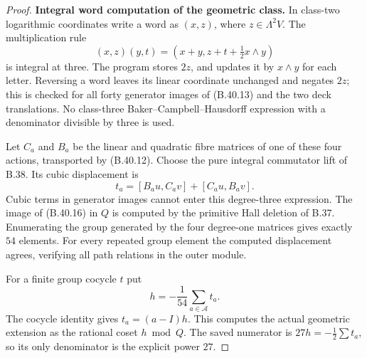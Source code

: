 \begin{proof}
\par\smallskip\noindent\textbf{Integral word computation of the geometric class.}\enspace 
In class-two logarithmic coordinates write a word as
$(x,z)$, where $z\in\Lambda^2V$.
The multiplication rule
\[
 (x,z)(y,t)=(x+y,z+t+\tfrac12x\wedge y)
                                                               \tag{B.40.15}
\]
is integral at three.
The program stores $2z$, and updates it by $x\wedge y$
for each letter. Reversing a word leaves its linear
coordinate unchanged and negates $2z$; this is checked
for all forty generator images of (B.40.13) and the
two deck translations.
No class-three Baker--Campbell--Hausdorff expression
with a denominator divisible by three is used.

Let $C_a$ and $B_a$ be the linear and quadratic fibre
matrices of one of these four actions, transported by
(B.40.12). Choose the pure integral commutator lift
of B.38. Its cubic displacement is
\[
 t_a=[B_au,C_av]+[C_au,B_av].                                  \tag{B.40.16}
\]
Cubic terms in generator images cannot enter this
degree-three expression. The image of (B.40.16) in
$Q$ is computed by the primitive Hall deletion of
B.37. Enumerating the group generated by the four
degree-one matrices gives exactly $54$ elements.
For every repeated group element the computed
displacement agrees, verifying all path relations
in the outer module.

For a finite group cocycle $t$ put
\[
              h=-\frac1{54}\sum_{a\in\mathcal A}t_a.
                                                               \tag{B.40.17}
\]
The cocycle identity gives $t_a=(a-I)h$.
This computes the actual geometric extension as the
rational coset $h\bmod Q$. The saved numerator is
$27h=-\frac12\sum t_a$, so its only denominator is
the explicit power $27$.


\end{proof}

